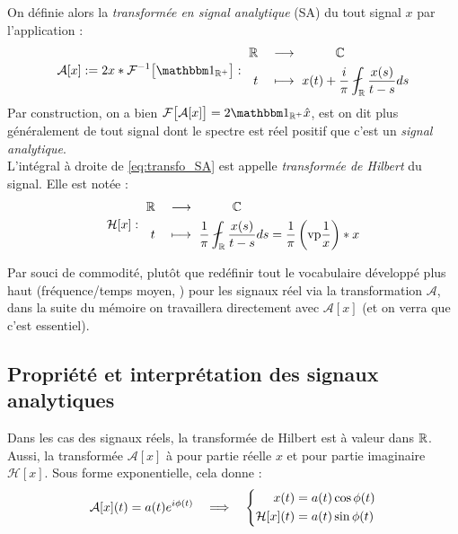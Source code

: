 \begin{definition}\label{def:transfo_sa&hilbert}
	On définie alors la \emph{transformée en signal analytique} (SA) du tout signal $x$ par l'application :
	\begin{equation}\label{eq:transfo_SA}
		\mathcal{A}[x] \defeq 2 x*\mathcal{F}^{-1}\big[\one_{\R^+}\big] :\ \begin{aligned} 
			\R \quad &\lr\qquad\quad \C \\	
			t\quad &\longmapsto\ x(t) + \frac{i}{\pi}\fint_\R \frac{x(s)}{t-s}ds
		\end{aligned}
	\end{equation}
	Par construction, on a bien $\mathcal{F}\big[\mathcal{A}[x]\big] = 2\one_{\R^+}\hat{x}$, est on dit plus généralement de tout signal dont le spectre est réel positif que c'est un \emph{signal analytique}.
	\\
	L'intégral à droite de \eqref{eq:transfo_SA} est appelle \emph{transformée de Hilbert} du signal. Elle est notée :
	\begin{equation}\label{eq:transfo_Hilb}
		\mathcal{H}[x] :\ \begin{aligned} 
			\R \quad &\lr\qquad\quad \C \\	
			t\quad &\longmapsto\ \frac{1}{\pi}\fint_\R \frac{x(s)}{t-s}ds =  \frac{1}{\pi}\left(\text{vp}\frac{1}{x}\right)*x
		\end{aligned}
	\end{equation}
\end{definition}

Par souci de commodité, plutôt que redéfinir tout le vocabulaire développé plus haut (fréquence/temps moyen, \etc) pour les signaux réel via la transformation $\mathcal{A}$, dans la suite du mémoire on travaillera directement avec $\mathcal{A}[x]$ (et on verra que c'est essentiel).




\subsection{Propriété et interprétation des signaux analytiques}


Dans les cas des signaux réels, la transformée de Hilbert est à valeur dans $\mathbb{R}$. Aussi, la transformée $\mathcal{A}[x]$ à pour partie réelle $x$ et pour partie imaginaire $\mathcal{H}[x]$. Sous forme exponentielle, cela donne :
\[\mathcal{A}[x](t) = a(t)e^{i\phi(t)}\quad \Longrightarrow\quad \left\{\begin{aligned}x(t) &= a(t) \cos\phi(t) \\\mathcal{H}[x](t) &= a(t) \sin\phi(t)
\end{aligned}\right.\]
\\

